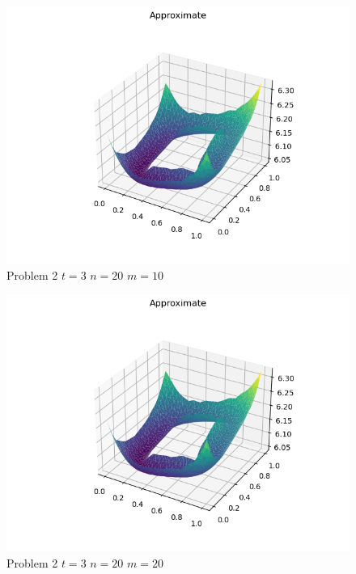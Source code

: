 \documentclass{report}
\begin{document}
\begin{figure}[h]
	\caption{Problem 2 $t = 3$ $n = 20$ $m = 10$}
	\includegraphics[width=\textwidth]{example.png}
\end{figure}
\begin{figure}[h]
	\caption{Problem 2 $t = 3$ $n = 20$ $m = 20$}
	\includegraphics[width=\textwidth]{example.png}
\end{figure}
\end{document}
